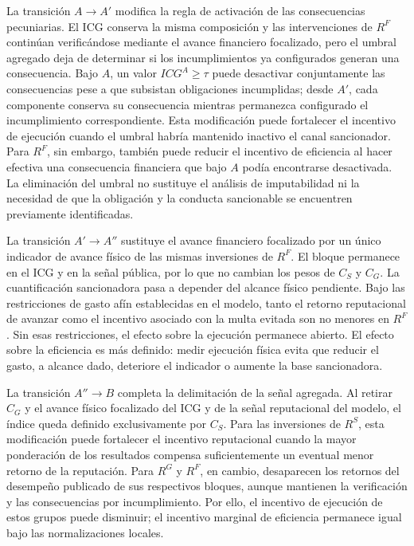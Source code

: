 La transición \(A\rightarrow A'\) modifica la regla de activación de las consecuencias pecuniarias. El ICG conserva la misma composición y las intervenciones de \(R^{F}\) continúan verificándose mediante el avance financiero focalizado, pero el umbral agregado deja de determinar si los incumplimientos ya configurados generan una consecuencia. Bajo \(A\), un valor \(ICG^{A}\geq\tau\) puede desactivar conjuntamente las consecuencias pese a que subsistan obligaciones incumplidas; desde \(A'\), cada componente conserva su consecuencia mientras permanezca configurado el incumplimiento correspondiente. Esta modificación puede fortalecer el incentivo de ejecución cuando el umbral habría mantenido inactivo el canal sancionador. Para \(R^{F}\), sin embargo, también puede reducir el incentivo de eficiencia al hacer efectiva una consecuencia financiera que bajo \(A\) podía encontrarse desactivada. La eliminación del umbral no sustituye el análisis de imputabilidad ni la necesidad de que la obligación y la conducta sancionable se encuentren previamente identificadas.

La transición \(A'\rightarrow A''\) sustituye el avance financiero focalizado por un único indicador de avance físico de las mismas inversiones de \(R^{F}\). El bloque permanece en el ICG y en la señal pública, por lo que no cambian los pesos de \(C_S\) y \(C_G\). La cuantificación sancionadora pasa a depender del alcance físico pendiente. Bajo las restricciones de gasto afín establecidas en el modelo, tanto el retorno reputacional de avanzar como el incentivo asociado con la multa evitada son no menores en \(R^{F}\). Sin esas restricciones, el efecto sobre la ejecución permanece abierto. El efecto sobre la eficiencia es más definido: medir ejecución física evita que reducir el gasto, a alcance dado, deteriore el indicador o aumente la base sancionadora.

La transición \(A''\rightarrow B\) completa la delimitación de la señal agregada. Al retirar \(C_G\) y el avance físico focalizado del ICG y de la señal reputacional del modelo, el índice queda definido exclusivamente por \(C_S\). Para las inversiones de \(R^{S}\), esta modificación puede fortalecer el incentivo reputacional cuando la mayor ponderación de los resultados compensa suficientemente un eventual menor retorno de la reputación. Para \(R^{G}\) y \(R^{F}\), en cambio, desaparecen los retornos del desempeño publicado de sus respectivos bloques, aunque mantienen la verificación y las consecuencias por incumplimiento. Por ello, el incentivo de ejecución de estos grupos puede disminuir; el incentivo marginal de eficiencia permanece igual bajo las normalizaciones locales.

